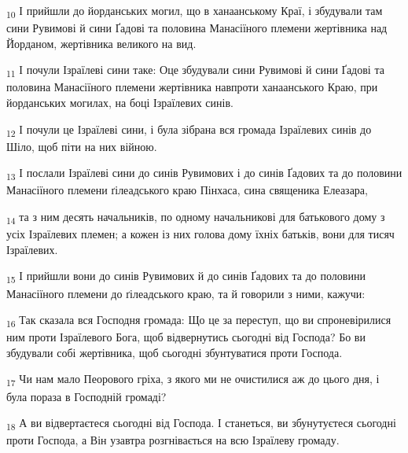 \begin{tcolorbox}
\textsubscript{10} І прийшли до йорданських могил, що в ханаанському Краї, і збудували там сини Рувимові й сини Ґадові та половина Манасіїного племени жертівника над Йорданом, жертівника великого на вид.
\end{tcolorbox}
\begin{tcolorbox}
\textsubscript{11} І почули Ізраїлеві сини таке: Оце збудували сини Рувимові й сини Ґадові та половина Манасіїного племени жертівника навпроти ханаанського Краю, при йорданських могилах, на боці Ізраїлевих синів.
\end{tcolorbox}
\begin{tcolorbox}
\textsubscript{12} І почули це Ізраїлеві сини, і була зібрана вся громада Ізраїлевих синів до Шіло, щоб піти на них війною.
\end{tcolorbox}
\begin{tcolorbox}
\textsubscript{13} І послали Ізраїлеві сини до синів Рувимових і до синів Ґадових та до половини Манасіїного племени ґілеадського краю Пінхаса, сина священика Елеазара,
\end{tcolorbox}
\begin{tcolorbox}
\textsubscript{14} та з ним десять начальників, по одному начальникові для батькового дому з усіх Ізраїлевих племен; а кожен із них голова дому їхніх батьків, вони для тисяч Ізраїлевих.
\end{tcolorbox}
\begin{tcolorbox}
\textsubscript{15} І прийшли вони до синів Рувимових й до синів Ґадових та до половини Манасіїного племени до ґілеадського краю, та й говорили з ними, кажучи:
\end{tcolorbox}
\begin{tcolorbox}
\textsubscript{16} Так сказала вся Господня громада: Що це за переступ, що ви спроневірилися ним проти Ізраїлевого Бога, щоб відвернутись сьогодні від Господа? Бо ви збудували собі жертівника, щоб сьогодні збунтуватися проти Господа.
\end{tcolorbox}
\begin{tcolorbox}
\textsubscript{17} Чи нам мало Пеорового гріха, з якого ми не очистилися аж до цього дня, і була пораза в Господній громаді?
\end{tcolorbox}
\begin{tcolorbox}
\textsubscript{18} А ви відвертаєтеся сьогодні від Господа. І станеться, ви збунутуєтеся сьогодні проти Господа, а Він узавтра розгнівається на всю Ізраїлеву громаду.
\end{tcolorbox}
